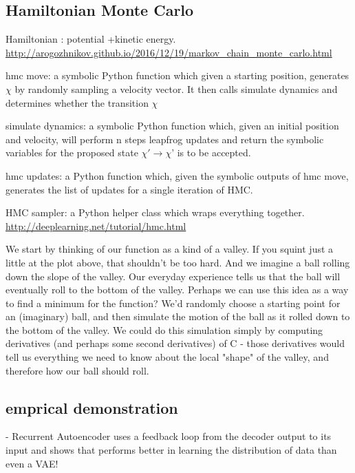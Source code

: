 \documentclass[aps,preprint,showpacs,superscriptaddress,groupedaddress]{revtex4}  %
\begin{document}
\subsection{Hamiltonian Monte Carlo}
Hamiltonian : potential +kinetic energy. \url{http://arogozhnikov.github.io/2016/12/19/markov_chain_monte_carlo.html}

hmc move: a symbolic Python function which given a starting position, generates $\chi$ by randomly sampling a velocity vector. It then calls simulate dynamics and determines whether the transition $\chi$

simulate dynamics: a symbolic Python function which, given an initial position and velocity, will perform n steps leapfrog updates and return the symbolic variables for the proposed state $\chi' \rightarrow \chi$' is to be accepted.

hmc updates: a Python function which, given the symbolic outputs of hmc move, generates the list of updates for a single iteration of HMC.

HMC sampler: a Python helper class which wraps everything together. \url{http://deeplearning.net/tutorial/hmc.html}


We start by thinking of our function as a kind of a valley. If you squint just a little at the plot above, that shouldn't be too hard. And we imagine a ball rolling down the slope of the valley. Our everyday experience tells us that the ball will eventually roll to the bottom of the valley. Perhaps we can use this idea as a way to find a minimum for the function? We'd randomly choose a starting point for an (imaginary) ball, and then simulate the motion of the ball as it rolled down to the bottom of the valley. We could do this simulation simply by computing derivatives (and perhaps some second derivatives) of C - those derivatives would tell us everything we need to know about the local "shape" of the valley, and therefore how our ball should roll.


\subsection{emprical demonstration}

- Recurrent Autoencoder uses a feedback loop from the decoder output to its input and shows that performs better in learning the distribution of data than even a VAE! 
\end{document}
